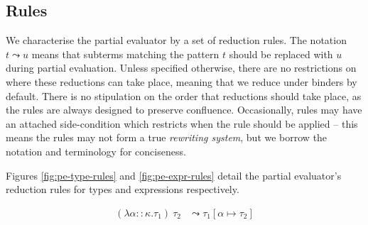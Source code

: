 \documentclass[runningheads]{llncs}
\begin{document}
\subsection{Rules}

We characterise the partial evaluator by a set of reduction rules. The notation $t \leadsto u$ means that subterms matching the pattern $t$ should be replaced with $u$ during partial evaluation. Unless specified otherwise, there are no restrictions on where these reductions can take place, meaning that we reduce under binders by default. There is no stipulation on the order that reductions should take place, as the rules are always designed to preserve confluence. Occasionally, rules may have an attached side-condition which restricts when the rule should be applied -- this means the rules may not form a true \emph{rewriting system}\cite{jay1991long}, but we borrow the notation and terminology for conciseness.

Figures \ref{fig:pe-type-rules} and \ref{fig:pe-expr-rules} detail the partial evaluator's reduction rules for types and expressions respectively.


\begin{figure*}[h]

  \begin{minipage}[c]{\textwidth}
    \begin{align}
      (\lambda \alpha :: \kappa . \tau_1)\ \tau_2 &\leadsto \tau_1[\alpha \mapsto \tau_2]
    \end{align}
  \end{minipage}

  \caption{Reduction rules for partially evaluating types.}
  \label{fig:pe-type-rules}
\end{figure*}

\end{document}
